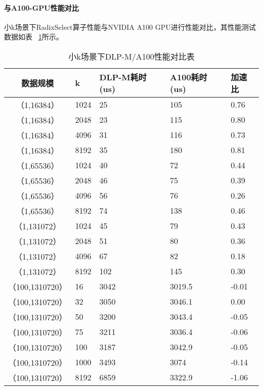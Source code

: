 \paragraph{与A100-GPU性能对比}
小k场景下RadixSelect算子性能与NVIDIA A100 GPU进行性能对比，其性能测试数据如表
~\ref{tab:lkvsa100}所示。
\begin{table}
    \centering
    \caption{小k场景下DLP-M/A100性能对比表}
    \begin{tabular}{cllll}
    \toprule
    数据规模 & k &   DLP-M耗时(us) & A100耗时(us) & 加速比 \\
    \midrule
    （1,16384） & 1024    & 25 & 105 & 0.76 \\
    （1,16384） & 2048   & 23 & 115 & 0.80 \\
    （1,16384） & 4096   & 31 & 116 & 0.73 \\
    （1,16384） & 8192   & 35 & 180 & 0.81 \\
    （1,65536） & 1024    & 40 & 72 & 0.44 \\
    （1,65536） & 2048    & 46 & 75 & 0.39 \\
    （1,65536） & 4096    & 56 & 76 & 0.26 \\
    （1,65536） & 8192   & 74 & 138 & 0.46 \\

    （1,131072） & 1024    & 45 & 79 & 0.43 \\
    （1,131072） & 2048    & 51 & 80 & 0.36 \\
    （1,131072） & 4096    & 67 & 82 & 0.18 \\
    （1,131072） & 8192   & 102 & 145 & 0.30 \\
    

    （100,1310720） &16      & 3042 & 3019.5 &  -0.01\\
    （100,1310720） &32 &  3050& 3046.1 &  0.00\\
    （100,1310720） &50  & 3200 & 3043.4 &  -0.05 \\
    （100,1310720） &75   & 3211 & 3036.4 &  -0.06 \\
    （100,1310720） &100    & 3187& 3042.9 &  -0.05 \\
    （100,1310720） &1000   & 3493& 3074   &   -0.14 \\
    （100,1310720） &8192    & 6859& 3322.9 & -1.06 \\

    \bottomrule
    \end{tabular}
\label{tab:lkvsa100}    
\end{table}
    
